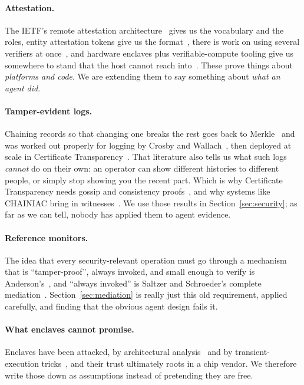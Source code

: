 \documentclass[11pt]{article}
\begin{document}
\paragraph{Attestation.} The IETF's remote attestation
architecture~\cite{rfc9334,ratsarch} gives us the vocabulary and the roles,
entity attestation tokens give us the format~\cite{rfc9711,tcg2024}, there is
work on using several verifiers at once~\cite{multiverifier}, and hardware
enclaves plus verifiable-compute tooling give us somewhere to stand that the
host cannot reach into~\cite{redhat2026,eqty2026}. These prove things about
\emph{platforms and code}. We are extending them to say something about
\emph{what an agent did}.

\paragraph{Tamper-evident logs.} Chaining records so that changing one breaks
the rest goes back to Merkle~\cite{merkle1987} and was worked out properly for
logging by Crosby and Wallach~\cite{crosby2009}, then deployed at scale in
Certificate Transparency~\cite{rfc6962,rfc9162}. That literature also tells us
what such logs \emph{cannot} do on their own: an operator can show different
histories to different people, or simply stop showing you the recent
part. Which is why Certificate Transparency needs gossip and consistency
proofs~\cite{ctgossip,chase2016}, and why systems like CHAINIAC bring in
witnesses~\cite{chainiac}. We use those results in
Section~\ref{sec:security}; as far as we can tell, nobody has applied them to
agent evidence.

\paragraph{Reference monitors.} The idea that every security-relevant
operation must go through a mechanism that is ``tamper-proof'', always invoked, %
and small enough to verify is Anderson's~\cite{anderson1972}, and
``always invoked'' is Saltzer and Schroeder's complete
mediation~\cite{saltzer1975}. Section~\ref{sec:mediation} is really just this
old requirement, applied carefully, and finding that the obvious agent design
fails it.

\paragraph{What enclaves cannot promise.} Enclaves have been attacked, by
architectural analysis~\cite{costan2016} and by transient-execution
tricks~\cite{foreshadow}, and their trust ultimately roots in a chip vendor.
We therefore write those down as assumptions instead of pretending they are
free.
\end{document}
